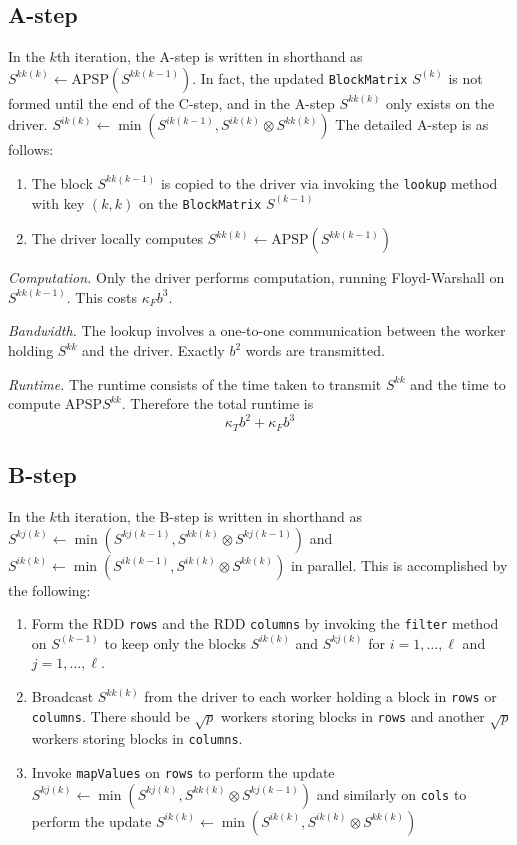 \documentclass{article} %
\begin{document}
\subsection{A-step}

In the $k$th iteration, the A-step is written in shorthand as
$S^{kk(k)} \leftarrow \text{APSP}(S^{kk(k-1)})$.  In fact, the updated
{\tt BlockMatrix} $S^{(k)}$ is not formed until the end of the C-step,
and in the A-step $S^{kk(k)}$ only exists on the driver.
$S^{ik(k)} \leftarrow \min(S^{ik(k-1)}, S^{ik(k)} \otimes S^{kk(k)})$
The detailed A-step is as follows:
\begin{enumerate}
\item The block $S^{kk(k-1)}$ is copied to the driver via invoking the {\tt lookup} method with key $(k, k)$ on the {\tt  BlockMatrix} $S^{(k-1)}$
\item The driver locally computes $S^{kk(k)} \leftarrow \text{APSP}(S^{kk(k-1)})$
\end{enumerate}

\emph{Computation.} Only the driver performs computation, running
Floyd-Warshall on $S^{kk(k-1)}$.  This costs $\kappa_F b^3$.

\emph{Bandwidth.}
The lookup involves a one-to-one communication between the worker holding $S^{kk}$ and the driver.
Exactly $b^2$ words are transmitted.

\emph{Runtime.}
The runtime consists of the time taken to transmit $S^{kk}$ and the time to compute $\text{APSP}S^{kk}$.
Therefore the total runtime is
\[
\kappa_T b^2 + \kappa_F b^3
\]

\subsection{B-step}
In the $k$th iteration, the B-step is written in shorthand as
 $S^{kj(k)} \leftarrow \min(S^{kj(k-1)}, S^{kk(k)} \otimes S^{kj(k-1)})$ 
and 
$S^{ik(k)} \leftarrow \min(S^{ik(k-1)}, S^{ik(k)} \otimes S^{kk(k)})$
 in parallel.
This is accomplished by the following:
\begin{enumerate}
\item Form the RDD {\tt rows} and the RDD {\tt columns} by invoking
  the {\tt filter} method on $S^{(k-1)}$ to keep only the blocks
  $S^{ik(k)}$ and $S^{kj(k)}$ for $i = 1,\hdots, \ell$ and $j =
  1,\hdots, \ell$.
\item Broadcast $S^{kk(k)}$ from the driver to each worker holding a
  block in {\tt rows} or {\tt columns}.  There should be $\sqrt{p}$
  workers storing blocks in {\tt rows} and another $\sqrt{p}$ workers
  storing blocks in {\tt columns}.
\item Invoke {\tt mapValues} on {\tt rows} to perform the update
  $S^{kj(k)} \leftarrow \min(S^{kj(k)}, S^{kk(k)} \otimes S^{kj(k-1)})$ and similarly
  on {\tt cols} to perform the update $S^{ik(k)} \leftarrow \min(S^{ik(k)}, S^{ik(k)}
  \otimes S^{kk(k)})$
\end{enumerate}
\end{document}
